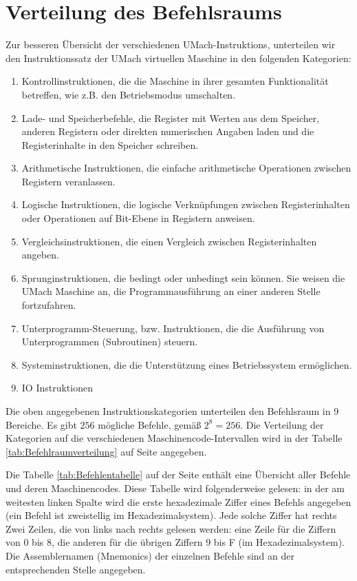 \section{Verteilung des Befehlsraums}
Zur besseren Übersicht der verschiedenen UMach-\glspl{Instruktion}, unterteilen
wir den \gls{Instruktionssatz} der UMach virtuellen Maschine in den folgenden
Kategorien:

\begin{enumerate}
  \item Kontrollinstruktionen,  die die Maschine in ihrer gesamten
    Funktionalität betreffen, wie z.B. den Betriebsmodus umschalten.
  \item Lade- und Speicherbefehle, die Register mit Werten aus dem Speicher, 
    anderen Registern oder direkten numerischen Angaben laden und die
    Registerinhalte in den Speicher schreiben.
  \item Arithmetische Instruktionen, die einfache arithmetische Operationen
    zwischen Registern veranlassen.
  \item Logische Instruktionen, die logische Verknüpfungen zwischen
    Registerinhalten oder Operationen auf Bit-Ebene in Registern anweisen.
  \item Vergleichsinstruktionen, die einen Vergleich zwischen
    Registerinhalten angeben.
  \item Sprunginstruktionen, die bedingt oder unbedingt sein können.
    Sie weisen die UMach Maschine an, die Programmausführung an einer anderen
    Stelle fortzufahren.
  \item Unterprogramm-Steuerung, bzw. Instruktionen, die die Ausführung von
    Unterprogrammen (Subroutinen) steuern.
  \item Systeminstruktionen, die die Unterstützung eines
    Betriebssystem ermöglichen.
  \item IO Instruktionen
\end{enumerate}

Die oben angegebenen Instruktionskategorien unterteilen den \gls{Befehlsraum} in
9 Bereiche. Es gibt $256$ mögliche Befehle, gemäß $2^{8} = 256$.
Die Verteilung der Kategorien auf die verschiedenen Maschinencode-Intervallen
wird in der Tabelle \ref{tab:Befehlraumverteilung} auf Seite
\pageref{tab:Befehlraumverteilung} angegeben.




Die Tabelle \ref{tab:Befehlentabelle} auf der Seite 
\pageref{tab:Befehlentabelle} enthält eine Übersicht aller Befehle und
deren Maschinencodes.
Diese Tabelle wird folgenderweise gelesen:
in der am weitesten linken Spalte wird die erste hexadezimale Ziffer eines
Befehls angegeben (ein Befehl ist zweistellig im Hexadezimalsystem).
Jede solche Ziffer hat rechts Zwei Zeilen, die von links nach rechts gelesen
werden: eine Zeile für die Ziffern von 0 bis 8, die anderen für die übrigen
Ziffern 9 bis F (im Hexadezimalsystem). Die Assemblernamen (Mnemonics) der
einzelnen Befehle sind an der entsprechenden Stelle angegeben.

